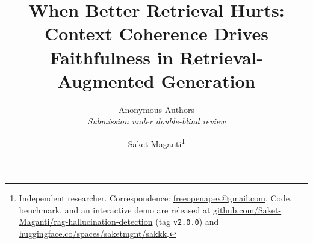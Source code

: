 \documentclass[12pt]{article}
\title{\LARGE\bfseries When Better Retrieval Hurts:\\[0.3em]
Context Coherence Drives Faithfulness in Retrieval-Augmented Generation}
\author{Anonymous Authors\\\textit{Submission under double-blind review}}
\author{%
    Saket Maganti\thanks{%
      Independent researcher.  Correspondence:
      \href{mailto:freeopenapex@gmail.com}{freeopenapex@gmail.com}.
      Code, benchmark, and an interactive demo are released at
      \href{https://github.com/Saket-Maganti/rag-hallucination-detection}{github.com/Saket-Maganti/rag-hallucination-detection}
      (tag \texttt{v2.0.0}) and
      \href{https://huggingface.co/spaces/saketmgnt/sakkk}{huggingface.co/spaces/saketmgnt/sakkk}.
    }
  }
\date{}
\theoremstyle{plain}
\theoremstyle{definition}
\begin{document}
\maketitle

\begin{abstract}

\end{abstract}






\end{document}
